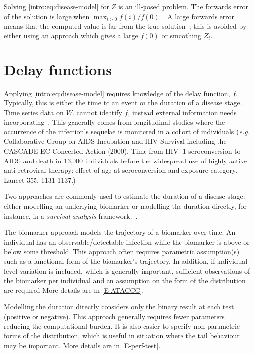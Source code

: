 \documentclass[thesis.tex]{subfiles}
\begin{document}
Solving \cref{intro:eq:disease-model} for $Z$ is an ill-posed problem.
The forwards error of the solution is large when $\max_{i > 0} f(i) / f(0)$~\autocite[chapter 8.2]{highamAccuracy}.
A large forwards error means that the computed value is far from the true solution~\autocite[6--9]{highamAccuracy}; this is avoided by either using an approach which gives a large $f(0)$ or smoothing $Z_t$.

\section{Delay functions}

Applying \cref{intro:eq:disease-model} requires knowledge of the delay function, $f$.
Typically, this is either the time to an event or the duration of a disease stage.
Time series data on $W_t$ cannot identify $f$, instead external information needs incorporating~\autocite{swallow2022challenges}.  This generally comes from longitudinal studies where the occurrence of the infection's sequelae is monitored in a cohort of individuals ({\it e.g.} Collaborative Group on AIDS Incubation and HIV Survival including the CASCADE EC
Concerted Action (2000). Time from HIV- 1
seroconversion to AIDS and death in 13,000 individuals before the widespread use of
highly active anti-retroviral therapy: effect of age at seroconversion and exposure
category. Lancet 355, 1131-1137.)

Two approaches are commonly used to estimate the duration of a disease stage: either modelling an underlying biomarker or modelling the duration directly, for instance, in a \emph{survival analysis} framework.~\autocite[e.g.][]{sweetingEstimating}.

The biomarker approach models the trajectory of a biomarker over time.
An individual has an observable/detectable infection while the biomarker is above or below some threshold.
This approach often requires parametric assumption(s) such as a functional form of the biomarker's trajectory.
In addition, if individual-level variation is included, which is generally important,  sufficient observations of the biomarker per individual and an assumption on the form of the distribution are required
More details are in \cref{E-ATACCC}.

Modelling the duration directly considers only the binary result at each test (positive or negative).
This approach generally requires fewer parameters reducing the computational burden.
It is also easier to specify non-parametric forms of the distribution, which is useful in situation where the tail behaviour may be important.
More details are in \cref{E-perf-test}.
\end{document}
